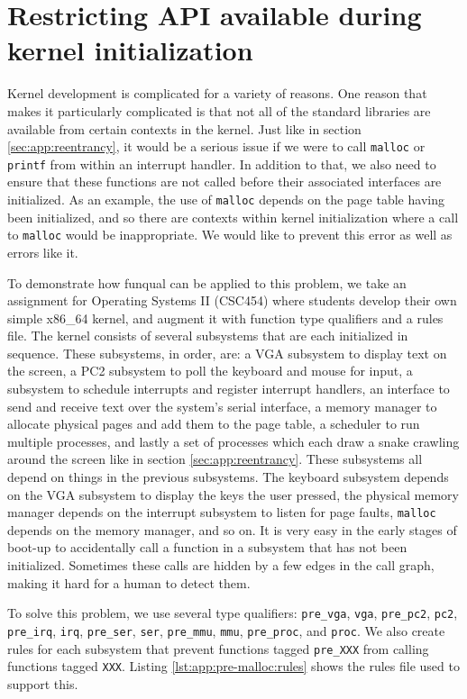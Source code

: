 \section{Restricting API available during kernel initialization}\label{sec:app:pre-malloc}

Kernel development is complicated for a variety of reasons.  One reason that makes it particularly complicated is that not all of the standard libraries are available from certain contexts in the kernel.  Just like in section \ref{sec:app:reentrancy}, it would be a serious issue if we were to call \lstinline{malloc} or \lstinline{printf} from within an interrupt handler.  In addition to that, we also need to ensure that these functions are not called before their associated interfaces are initialized.  As an example, the use of \lstinline{malloc} depends on the page table having been initialized, and so there are contexts within kernel initialization where a call to \lstinline{malloc} would be inappropriate.  We would like to prevent this error as well as errors like it. 

To demonstrate how funqual can be applied to this problem, we take an assignment for Operating Systems II (CSC454) where students develop their own simple x86\_64 kernel, and augment it with function type qualifiers and a rules file.  The kernel consists of several subsystems that are each initialized in sequence.  These subsystems, in order, are: a VGA subsystem to display text on the screen, a PC2 subsystem to poll the keyboard and mouse for input, a subsystem to schedule interrupts and register interrupt handlers, an interface to send and receive text over the system's serial interface, a memory manager to allocate physical pages and add them to the page table, a scheduler to run multiple processes, and lastly a set of processes which each draw a snake crawling around the screen like in section \ref{sec:app:reentrancy}.  These subsystems all depend on things in the previous subsystems.  The keyboard subsystem depends on the VGA subsystem to display the keys the user pressed, the physical memory manager depends on the interrupt subsystem to listen for page faults, \lstinline{malloc} depends on the memory manager, and so on.  It is very easy in the early stages of boot-up to accidentally call a function in a subsystem that has not been initialized.  Sometimes these calls are hidden by a few edges in the call graph, making it hard for a human to detect them.  

To solve this problem, we use several type qualifiers:  \lstinline{pre_vga}, \lstinline{vga}, \lstinline{pre_pc2}, \lstinline{pc2}, \lstinline{pre_irq}, \lstinline{irq}, \lstinline{pre_ser}, \lstinline{ser}, \lstinline{pre_mmu}, \lstinline{mmu}, \lstinline{pre_proc}, and \lstinline{proc}.  We also create rules for each subsystem that prevent functions tagged \lstinline{pre_XXX} from calling functions tagged \lstinline{XXX}.  Listing \ref{lst:app:pre-malloc:rules} shows the rules file used to support this.  


